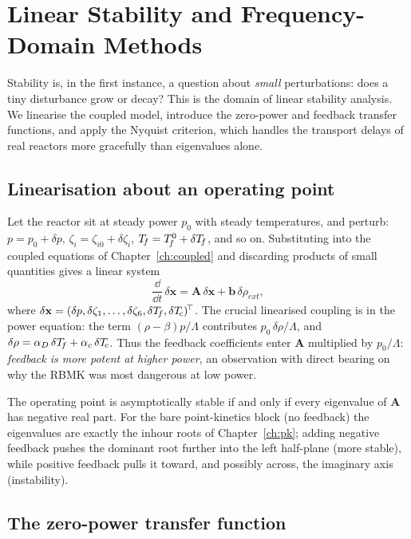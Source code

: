 \chapter{Linear Stability and Frequency-Domain Methods}
\label{ch:linear}

Stability is, in the first instance, a question about \emph{small} perturbations:
does a tiny disturbance grow or decay? This is the domain of linear stability
analysis. We linearise the coupled model, introduce the zero-power and
feedback transfer functions, and apply the Nyquist criterion, which handles the
transport delays of real reactors more gracefully than eigenvalues alone.

\section{Linearisation about an operating point}

Let the reactor sit at steady power $p_0$ with steady temperatures, and perturb:
$p=p_0+\delta p$, $\zeta_i=\zeta_{i0}+\delta\zeta_i$, $T_{\!f}=T_{\!f}^0+\delta T_{\!f}$, and
so on. Substituting into the coupled equations of Chapter~\ref{ch:coupled} and
discarding products of small quantities gives a linear system
\begin{equation}
\frac{\dd}{\dd t}\,\delta\mathbf{x} = \mathbf{A}\,\delta\mathbf{x}
   + \mathbf{b}\,\delta\rho_{ext},
\end{equation}
where $\delta\mathbf{x}=(\delta p,\delta\zeta_1,\dots,\delta\zeta_6,
\delta T_{\!f},\delta T_{\!c})^{\!\top}$. The crucial linearised coupling is in the power
equation: the term $(\rho-\beta)p/\Lambda$ contributes
$p_0\,\delta\rho/\Lambda$, and $\delta\rho = \alpha_D\,\delta T_{\!f} +
\alpha_c\,\delta T_{\!c}$. Thus the feedback coefficients enter $\mathbf A$ multiplied
by $p_0/\Lambda$: \emph{feedback is more potent at higher power}, an observation
with direct bearing on why the RBMK was most dangerous at low power.

The operating point is asymptotically stable if and only if every eigenvalue of
$\mathbf A$ has negative real part. For the bare point-kinetics block (no
feedback) the eigenvalues are exactly the inhour roots of
Chapter~\ref{ch:pk}; adding negative feedback pushes the dominant root further
into the left half-plane (more stable), while positive feedback pulls it toward,
and possibly across, the imaginary axis (instability).

\section{The zero-power transfer function}

